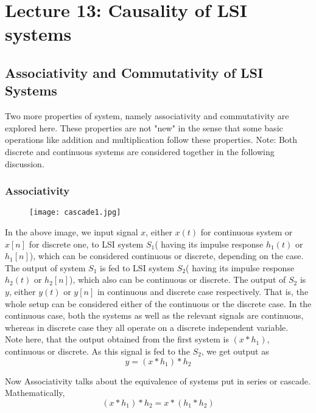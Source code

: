 \section{Lecture 13: Causality of LSI systems}




\subsection{Associativity and Commutativity of LSI Systems}
Two more properties of system, namely associativity and commutativity are explored here. These properties are not "new" in the sense that some basic operations like addition and multiplication follow these properties.
Note: Both discrete and continuous systems are considered together in the following discussion.

\subsubsection{Associativity}
\begin{figure}[ht]
\centering
\texttt{[image: cascade1.jpg]}
\end{figure}

In the above image, we input signal $x$, either $x(t)$ for continuous system or $x[n]$ for discrete one, to LSI system $S_{1}$( having its impulse response $h_{1}(t)$ or $h_{1}[n]$), which can be considered continuous or discrete, depending on the case. The output of system $S_{1}$ is fed to LSI system $S_{2}$( having its impulse response $h_{2}(t)$ or $h_{2}[n]$), which also can be continuous or discrete. The output of $S_{2}$ is $y$, either $y(t)$ or $y[n]$ in continuous and discrete case respectively. That is, the whole setup can be considered either of the continuous or the discrete case. In the continuous case, both the systems as well as the relevant signals are continuous, whereas in discrete case they all operate on a discrete independent variable.\\
Note here, that the output obtained from the first system is $(x*h_{1})$, continuous or discrete. As this signal is fed to the $S_{2}$, we get output as 
\begin{equation}
y=(x*h_{1})*h_{2} \nonumber
\end{equation}

Now Associativity talks about the equivalence of systems put in series or cascade. Mathematically,
\begin{equation}
(x*h_{1})*h_{2}=x*(h_{1}*h_{2}) \nonumber
\end{equation}

